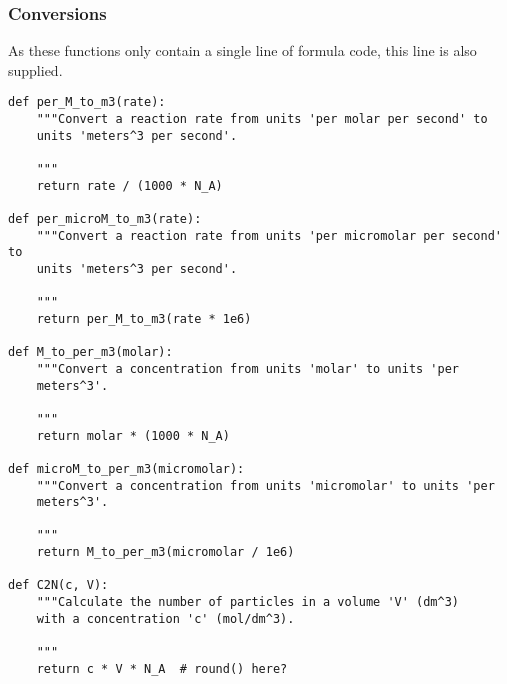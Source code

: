 \documentclass[a4paper,10pt]{article}
\begin{document}
\subsubsection{Conversions}

As these functions only contain a single line of formula code, this line is also supplied.
\begin{verbatim}
def per_M_to_m3(rate):
    """Convert a reaction rate from units 'per molar per second' to 
    units 'meters^3 per second'.

    """
    return rate / (1000 * N_A)

def per_microM_to_m3(rate):
    """Convert a reaction rate from units 'per micromolar per second' to 
    units 'meters^3 per second'.

    """
    return per_M_to_m3(rate * 1e6)

def M_to_per_m3(molar):
    """Convert a concentration from units 'molar' to units 'per 
    meters^3'.

    """
    return molar * (1000 * N_A)

def microM_to_per_m3(micromolar):
    """Convert a concentration from units 'micromolar' to units 'per 
    meters^3'.

    """
    return M_to_per_m3(micromolar / 1e6) 

def C2N(c, V):
    """Calculate the number of particles in a volume 'V' (dm^3) 
    with a concentration 'c' (mol/dm^3).

    """
    return c * V * N_A  # round() here?
\end{verbatim}
\end{document}
